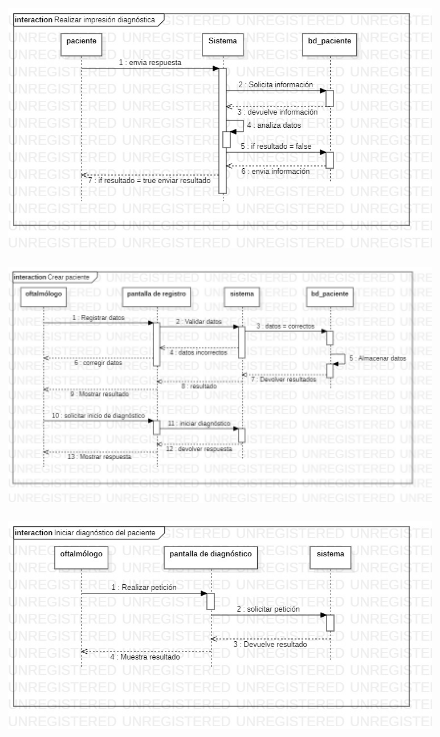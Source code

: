 \documentclass[10pt]{article}
\begin{document}
\begin{figure}[H]
	\begin{center}
\includegraphics[scale = 0.45]{UML/Secuencias/Caso_de_uso_3.jpg} 
	\end{center} 
\end{figure}


\begin{figure}[H]
	\begin{center}
\includegraphics[scale = 0.45]{UML/Secuencias/Caso_de_uso_4.jpg} 
	\end{center} 
\end{figure}


\begin{figure}[H]
	\begin{center}
\includegraphics[scale = 0.45]{UML/Secuencias/Caso_de_uso_5.jpg} 
	\end{center} 
\end{figure}
\end{document}
